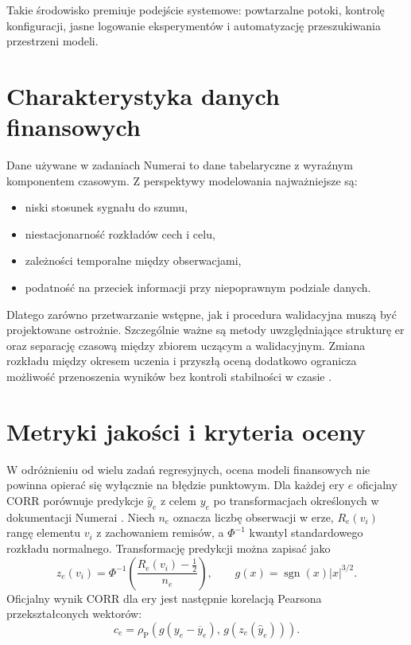 \documentclass[12pt,a4paper]{report}
\newcommand{\sourcecite}[1]{\autocite{#1}}
\begin{document}
Takie środowisko premiuje podejście systemowe: powtarzalne potoki, kontrolę konfiguracji,
jasne logowanie eksperymentów i automatyzację przeszukiwania przestrzeni modeli.

\section{Charakterystyka danych finansowych}
Dane używane w zadaniach Numerai to dane tabelaryczne z wyraźnym komponentem czasowym.
Z perspektywy modelowania najważniejsze są:
\begin{itemize}\item niski stosunek sygnału do szumu,
\item niestacjonarność rozkładów cech i celu,
\item zależności temporalne między obserwacjami,
\item podatność na przeciek informacji przy niepoprawnym podziale danych.\end{itemize}

Dlatego zarówno przetwarzanie wstępne, jak i procedura walidacyjna muszą być projektowane ostrożnie.
Szczególnie ważne są metody uwzględniające strukturę er oraz separację czasową
między zbiorem uczącym a walidacyjnym.
Zmiana rozkładu między okresem uczenia i przyszłą oceną dodatkowo ogranicza możliwość
przenoszenia wyników bez kontroli stabilności w czasie \sourcecite{sugiyama-shift}.

\section{Metryki jakości i kryteria oceny}
W odróżnieniu od wielu zadań regresyjnych, ocena modeli finansowych nie powinna
opierać się wyłącznie na błędzie punktowym. Dla każdej ery $e$ oficjalny CORR
porównuje predykcje $\hat{y}_e$ z celem $y_e$ po transformacjach określonych w
dokumentacji Numerai \sourcecite{numerai-corr}. Niech $n_e$ oznacza liczbę obserwacji
w erze, $R_e(v_i)$ rangę elementu $v_i$ z zachowaniem remisów, a $\Phi^{-1}$
kwantyl standardowego rozkładu normalnego. Transformację predykcji można zapisać jako
\begin{equation}
z_e(v_i)=\Phi^{-1}\!\left(\frac{R_e(v_i)-\tfrac{1}{2}}{n_e}\right),
\qquad g(x)=\operatorname{sgn}(x)|x|^{3/2}.
\label{eq:numerai-transform}
\end{equation}
Oficjalny wynik CORR dla ery jest następnie korelacją Pearsona przekształconych
wektorów:
\begin{equation}
c_e=\rho_{\mathrm{P}}\!\left(
g(y_e-\overline{y}_e),\,g(z_e(\hat{y}_e))
\right).
\label{eq:numerai-corr-era}
\end{equation}
\end{document}
